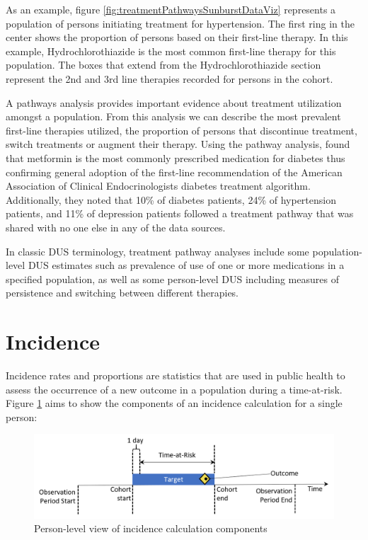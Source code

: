 \documentclass[11pt]{book}
\theoremstyle{definition}
\theoremstyle{definition}
\theoremstyle{definition}
\theoremstyle{remark}
\begin{document}
As an example, figure \ref{fig:treatmentPathwaysSunburstDataViz} represents a population of persons initiating treatment for hypertension. The first ring in the center shows the proportion of persons based on their first-line therapy. In this example, Hydrochlorothiazide is the most common first-line therapy for this population. The boxes that extend from the Hydrochlorothiazide section represent the 2nd and 3rd line therapies recorded for persons in the cohort.

A pathways analysis provides important evidence about treatment utilization amongst a population. From this analysis we can describe the most prevalent first-line therapies utilized, the proportion of persons that discontinue treatment, switch treatments or augment their therapy. Using the pathway analysis, \citet{Hripcsak7329} found that metformin is the most commonly prescribed medication for diabetes thus confirming general adoption of the first-line recommendation of the American Association of Clinical Endocrinologists diabetes treatment algorithm. Additionally, they noted that 10\% of diabetes patients, 24\% of hypertension patients, and 11\% of depression patients followed a treatment pathway that was shared with no one else in any of the data sources.

In classic DUS terminology, treatment pathway analyses include some population-level DUS estimates such as prevalence of use of one or more medications in a specified population, as well as some person-level DUS including measures of persistence and switching between different therapies.

\hypertarget{incidence}{%
\section{Incidence}\label{incidence}}

Incidence rates and proportions are statistics that are used in public health to assess the occurrence of a new outcome in a population during a time-at-risk. Figure \ref{fig:incidenceTimeline} aims to show the components of an incidence calculation for a single person:

\begin{figure}

{\centering \includegraphics[width=1\linewidth]{images/Characterization/incidenceTimeline} 

}

\caption{Person-level view of incidence calculation components}\label{fig:incidenceTimeline}
\end{figure}
\end{document}
